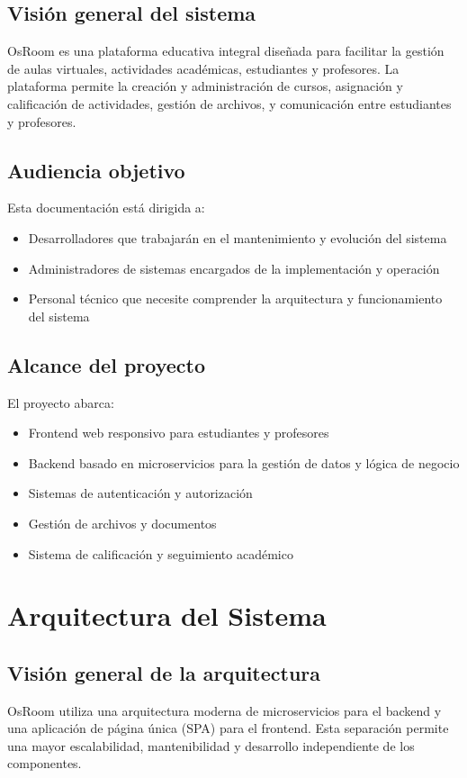 \documentclass[12pt,a4paper]{report}
\begin{document}
\section{Visión general del sistema}
OsRoom es una plataforma educativa integral diseñada para facilitar la gestión de aulas virtuales, actividades académicas, estudiantes y profesores. La plataforma permite la creación y administración de cursos, asignación y calificación de actividades, gestión de archivos, y comunicación entre estudiantes y profesores.

\section{Audiencia objetivo}
Esta documentación está dirigida a:
\begin{itemize}
    \item Desarrolladores que trabajarán en el mantenimiento y evolución del sistema
    \item Administradores de sistemas encargados de la implementación y operación
    \item Personal técnico que necesite comprender la arquitectura y funcionamiento del sistema
\end{itemize}

\section{Alcance del proyecto}
El proyecto abarca:
\begin{itemize}
    \item Frontend web responsivo para estudiantes y profesores
    \item Backend basado en microservicios para la gestión de datos y lógica de negocio
    \item Sistemas de autenticación y autorización
    \item Gestión de archivos y documentos
    \item Sistema de calificación y seguimiento académico
\end{itemize}

\chapter{Arquitectura del Sistema}
\section{Visión general de la arquitectura}
OsRoom utiliza una arquitectura moderna de microservicios para el backend y una aplicación de página única (SPA) para el frontend. Esta separación permite una mayor escalabilidad, mantenibilidad y desarrollo independiente de los componentes.
\end{document}
